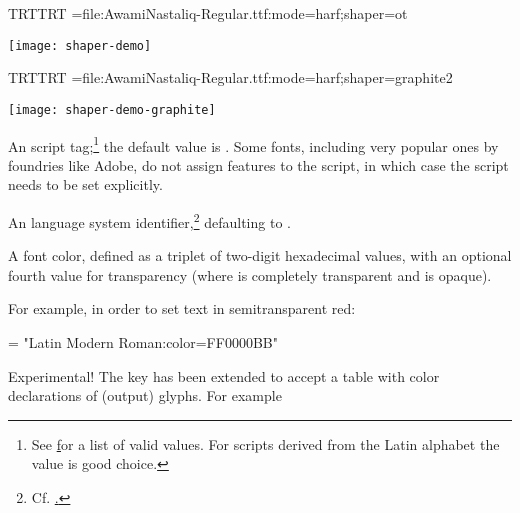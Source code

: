   \beginlisting
  \pardir TRT\textdir TRT
  \font\test={file:AwamiNastaliq-Regular.ttf:mode=harf;shaper=ot}
  \endlisting

  \texttt{[image: shaper-demo]}

  \beginlisting
  \pardir TRT\textdir TRT
  \font\test={file:AwamiNastaliq-Regular.ttf:mode=harf;shaper=graphite2}
  \endlisting

  \texttt{[image: shaper-demo-graphite]}

  \endaltitem
   \label{script-tag}
         An \OpenType script tag;\footnote{%
           See \hyperlink {http://www.microsoft.com/typography/otspec/scripttags.htm}
           for a list of valid values.
           For scripts derived from the Latin alphabet the value
            is good choice.
         }
         the default value is .
         Some fonts, including very popular ones by foundries like Adobe,
         do not assign features to the  script, in
         which case the script needs to be set explicitly.
  \endaltitem

         An \OpenType language system identifier,\footnote{%
           Cf. \hyperlink {http://www.microsoft.com/typography/otspec/languagetags.htm}.
         }
         defaulting to .
  \endaltitem

         A font color, defined as a triplet of two-digit hexadecimal
          values, with an optional fourth value for
         transparency
         (where  is completely transparent and
          is opaque).

         For example, in order to set text in semitransparent red:

         \beginlisting
      \font \test = "Latin Modern Roman:color=FF0000BB"
         \endlisting

         Experimental!\label{color-glyphs} The  key has been
         extended to accept a table with color declarations of (output) glyphs. For example

         \beginlisting
          \endlisting

